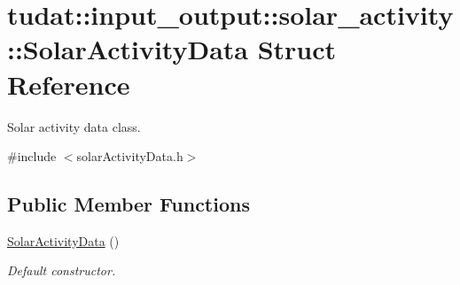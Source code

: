 \hypertarget{structtudat_1_1input__output_1_1solar__activity_1_1SolarActivityData}{}\section{tudat\+:\+:input\+\_\+output\+:\+:solar\+\_\+activity\+:\+:Solar\+Activity\+Data Struct Reference}
\label{structtudat_1_1input__output_1_1solar__activity_1_1SolarActivityData}


Solar activity data class.  




{\ttfamily \#include $<$solar\+Activity\+Data.\+h$>$}

\subsection*{Public Member Functions}
\begin{DoxyCompactItemize}
\item 
\hyperlink{structtudat_1_1input__output_1_1solar__activity_1_1SolarActivityData_aa6689acde3fe363ef92cc6cc825b6ebf}{Solar\+Activity\+Data} ()
\begin{DoxyCompactList}\small\item\em Default constructor. \end{DoxyCompactList}\end{DoxyCompactItemize}

